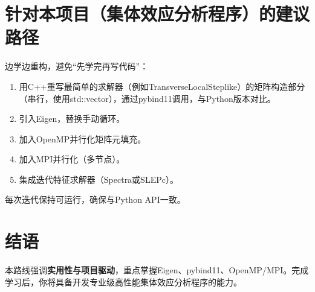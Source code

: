 \documentclass[12pt,a4paper]{article}
\begin{document}
\section{针对本项目（集体效应分析程序）的建议路径}
边学边重构，避免“先学完再写代码”：
\begin{enumerate}
    \item 用C++重写最简单的求解器（例如TransverseLocalSteplike）的矩阵构造部分（串行，使用std::vector），通过pybind11调用，与Python版本对比。
    \item 引入Eigen，替换手动循环。
    \item 加入OpenMP并行化矩阵元填充。
    \item 加入MPI并行化（多节点）。
    \item 集成迭代特征求解器（Spectra或SLEPc）。
\end{enumerate}
每次迭代保持可运行，确保与Python API一致。

\section{结语}
本路线强调\textbf{实用性与项目驱动}，重点掌握Eigen、pybind11、OpenMP/MPI。完成学习后，你将具备开发专业级高性能集体效应分析程序的能力。
\end{document}
